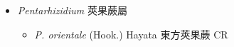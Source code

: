 
  \begin{itemize}
 \item[] \textit{Pentarhizidium} 莢果蕨屬
                                
  \begin{itemize}
        \item[] \textit{P. orientale} (Hook.) Hayata  東方莢果蕨   CR
  \end{itemize}
  \end{itemize}
